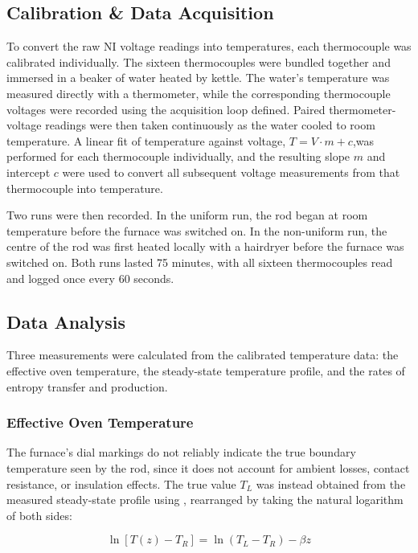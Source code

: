 \documentclass[11pt, a4paper, twocolumn]{article}
\begin{document}
\subsection{Calibration \& Data Acquisition}

To convert the raw NI voltage readings into temperatures, each thermocouple was calibrated individually. The sixteen thermocouples were bundled together and immersed in a beaker of water heated by kettle. The water's temperature was measured directly with a thermometer, while the corresponding thermocouple voltages were recorded using the acquisition loop defined. Paired thermometer-voltage readings were then taken continuously as the water cooled to room temperature. A linear fit of temperature against voltage, $T=V\cdot m + c$,was performed for each thermocouple individually, and the resulting slope $m$ and intercept $c$ were used to convert all subsequent voltage measurements from that thermocouple into temperature.

Two runs were then recorded. In the uniform run, the rod began at room temperature before the furnace was switched on. In the non-uniform run, the centre of the rod was first heated locally with a hairdryer before the furnace was switched on. Both runs lasted 75 minutes, with all sixteen thermocouples read and logged once every 60 seconds.

\subsection{Data Analysis}

Three measurements were calculated from the calibrated temperature data: the effective oven temperature, the steady-state temperature profile, and the rates of entropy transfer and production.

\subsubsection{Effective Oven Temperature}

The furnace's dial markings do not reliably indicate the true boundary temperature seen by the rod, since it does not account for ambient losses, contact resistance, or insulation effects. The true value $T_L$ was instead obtained from the measured steady-state profile using , rearranged by taking the natural logarithm of both sides:

\vspace{-3ex}
\begin{equation} \label{eq:8}
  \ln[T(z)-T_R] = \ln(T_L-T_R) - \beta z
\end{equation}
\end{document}
